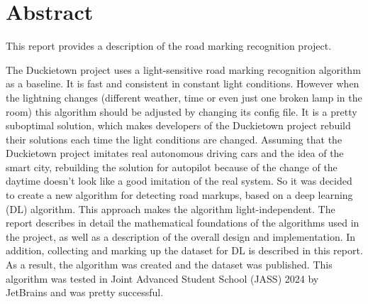 \section*{Abstract}
This report provides a description of the road marking recognition project.

The Duckietown project uses a light-sensitive road marking recognition algorithm as a baseline. It is fast and consistent in constant light conditions. However when 
the lightning changes (different weather, time or even just one broken lamp in the room) this algorithm should be adjusted by changing its config file. 
It is a pretty suboptimal solution, which makes developers of the Duckietown project rebuild their solutions each time the light conditions are changed. 
Assuming that the Duckietown project imitates real autonomous driving cars and the idea of the smart city, rebuilding the solution for autopilot because of the 
change of the daytime doesn't look like a good imitation of the real system. So it was decided to create a new algorithm for detecting road markups, based on a deep learning 
(DL) algorithm. This approach makes the algorithm light-independent.
The report describes in detail the mathematical foundations of the algorithms used in the project, as well as a description of the overall design and implementation. 
In addition, collecting and marking up the dataset for DL is described in this report.
As a result, the algorithm was created and the dataset was published. This algorithm was tested in Joint Advanced Student School (JASS) 2024 by JetBrains and was pretty 
successful.
